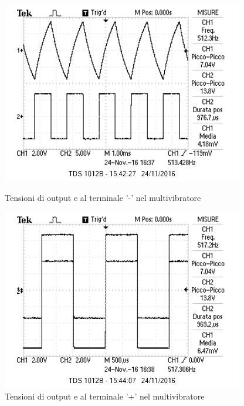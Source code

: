 \documentclass[10pt,a4paper]{article}
\begin{document}
\begin{figure}[H]
    \centering
    \begin{minipage}{0.49\textwidth}
        \centering
        \includegraphics[width = \textwidth]{../oscilloscopio/multivibratore.jpg}
        \caption{Tensioni di output e al terminale '-' nel multivibratore}
        \label{fig:multivibratore-}
    \end{minipage}
    \begin{minipage}{0.49\textwidth}
        \centering
        \includegraphics[width = \textwidth]{../oscilloscopio/multivibratore_V+.jpg}
        \caption{Tensioni di output e al terminale '+' nel multivibratore}
        \label{fig:multivibratore+}
    \end{minipage}
\end{figure}
\end{document}

